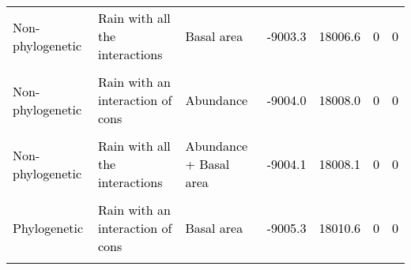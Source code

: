 \documentclass[
  12pt,
  letterpaper,
  DIV=11,
  numbers=noendperiod]{scrartcl}
\begin{document}
\begin{table}[H]
{\begin{tabular}[t]{lllllll}
\addlinespace
\textcolor{black}{Non-phylogenetic} & \textcolor{black}{Rain with all the interactions} & \textcolor{black}{Basal area} & \textcolor{black}{-9003.3} & \textcolor{black}{18006.6} & \textcolor{black}{0} & \textcolor{black}{0}\\
\cellcolor{gray!6}{\textcolor{black}{Phylogenetic}} & \cellcolor{gray!6}{\textcolor{black}{Rain with an interaction of cons}} & \cellcolor{gray!6}{\textcolor{black}{Abundance}} & \cellcolor{gray!6}{\textcolor{black}{-9003.7}} & \cellcolor{gray!6}{\textcolor{black}{18007.4}} & \cellcolor{gray!6}{\textcolor{black}{0}} & \cellcolor{gray!6}{\textcolor{black}{0}}\\
\textcolor{black}{Non-phylogenetic} & \textcolor{black}{Rain with an interaction of cons} & \textcolor{black}{Abundance} & \textcolor{black}{-9004.0} & \textcolor{black}{18008.0} & \textcolor{black}{0} & \textcolor{black}{0}\\
\cellcolor{gray!6}{\textcolor{black}{Phylogenetic}} & \cellcolor{gray!6}{\textcolor{black}{Rain with all the interactions}} & \cellcolor{gray!6}{\textcolor{black}{Abundance + Basal area}} & \cellcolor{gray!6}{\textcolor{black}{-9004.0}} & \cellcolor{gray!6}{\textcolor{black}{18008.1}} & \cellcolor{gray!6}{\textcolor{black}{0}} & \cellcolor{gray!6}{\textcolor{black}{0}}\\
\textcolor{black}{Non-phylogenetic} & \textcolor{black}{Rain with all the interactions} & \textcolor{black}{Abundance + Basal area} & \textcolor{black}{-9004.1} & \textcolor{black}{18008.1} & \textcolor{black}{0} & \textcolor{black}{0}\\
\addlinespace
\cellcolor{gray!6}{\textcolor{black}{Non-phylogenetic}} & \cellcolor{gray!6}{\textcolor{black}{Rain without interactions}} & \cellcolor{gray!6}{\textcolor{black}{Abundance}} & \cellcolor{gray!6}{\textcolor{black}{-9005.1}} & \cellcolor{gray!6}{\textcolor{black}{18010.3}} & \cellcolor{gray!6}{\textcolor{black}{0}} & \cellcolor{gray!6}{\textcolor{black}{0}}\\
\textcolor{black}{Phylogenetic} & \textcolor{black}{Rain with an interaction of cons} & \textcolor{black}{Basal area} & \textcolor{black}{-9005.3} & \textcolor{black}{18010.6} & \textcolor{black}{0} & \textcolor{black}{0}\\
\cellcolor{gray!6}{\textcolor{black}{Non-phylogenetic}} & \cellcolor{gray!6}{\textcolor{black}{Rain with an interaction of cons}} & \cellcolor{gray!6}{\textcolor{black}{Abundance + Basal area}} & \cellcolor{gray!6}{\textcolor{black}{-9005.4}} & \cellcolor{gray!6}{\textcolor{black}{18010.9}} & \cellcolor{gray!6}{\textcolor{black}{0}} & \cellcolor{gray!6}{\textcolor{black}{0}}\\

\end{tabular}}
\end{table}
\end{document}
